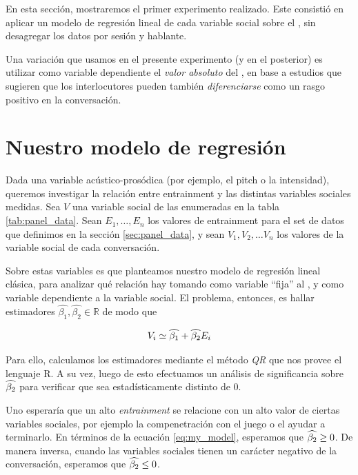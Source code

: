 En esta sección, mostraremos el primer experimento realizado. Este consistió en aplicar un modelo de regresión lineal de cada variable social sobre el \entrainment, sin desagregar los datos por sesión y hablante.

Una variación que usamos en el presente experimento (y en el posterior) es utilizar como variable dependiente el \emph{valor absoluto} del \entrainment, en base a estudios que sugieren que los interlocutores pueden también \emph{diferenciarse} como un rasgo positivo en la conversación.

\section{Nuestro modelo de regresión}

Dada una variable acústico-prosódica (por ejemplo, el pitch o la intensidad), queremos investigar la relación entre entrainment y las distintas variables sociales medidas. Sea $V$ una variable social de las enumeradas en la tabla \ref{tab:panel_data}. Sean $E_1, \ldots, E_n$ los valores de entrainment para el set de datos que definimos en la sección \ref{sec:panel_data}, y sean $V_1, V_2, \ldots V_n$ los valores de la variable social de cada conversación.

Sobre estas variables es que planteamos nuestro modelo de regresión lineal clásica, para analizar qué relación hay tomando como variable ``fija'' al \entrainment, y como variable dependiente a la variable social. El problema, entonces, es hallar estimadores $\widehat{\beta_1}, \widehat{\beta_2} \in \mathbb{R}$ de modo que

\begin{equation}
  V_i \simeq \widehat{\beta_1} + \widehat{\beta_2} E_i
  \label{eq:my_model}
\end{equation}


Para ello, calculamos los estimadores mediante el método \emph{QR} que nos provee el lenguaje R. A su vez, luego de esto efectuamos un análisis de significancia sobre $\widehat{\beta_2}$ para verificar que sea estadísticamente distinto de 0.

Uno esperaría que un alto \emph{entrainment} se relacione con un alto valor de ciertas variables sociales, por ejemplo la compenetración con el juego o el ayudar a terminarlo. En términos de la ecuación \ref{eq:my_model}, esperamos que $\widehat{\beta_2} \geq 0$. De manera inversa, cuando las variables sociales tienen un carácter negativo de la conversación, esperamos que $\widehat{\beta_2} \leq 0$.


